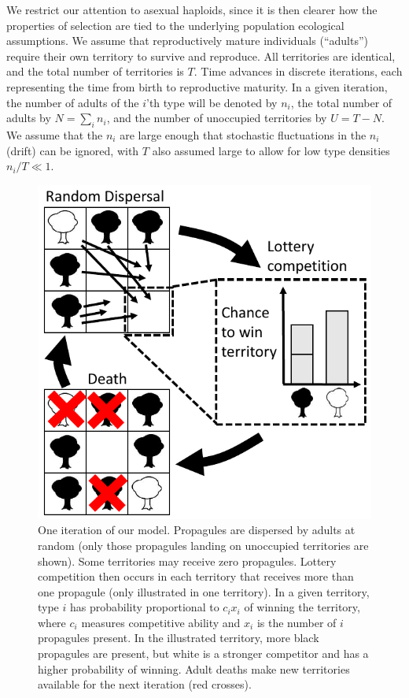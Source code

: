 \documentclass[12pt]{article}
\begin{document}
We restrict our attention to asexual haploids, since it is then clearer how the properties of selection are tied to the underlying population ecological assumptions. We assume that reproductively mature individuals (``adults'') require their own territory to survive and reproduce. All territories are identical, and the total number of territories is $T$. Time advances in discrete iterations, each representing the time from birth to reproductive maturity. In a given iteration, the number of adults of the $i$'th type will be denoted by $n_i$, the total number of adults by $N=\sum_i n_i$, and the number of unoccupied territories by $U=T-N$. We assume that the $n_i$ are large enough that stochastic fluctuations in the $n_i$ (drift) can be ignored, with $T$ also assumed large to allow for low type densities $n_i/T\ll 1$.  

\begin{figure}
\centering
\includegraphics[scale=0.8]{lottery.pdf}
\caption{\label{fig:lottery} One iteration of our model. Propagules are dispersed by adults at random (only those propagules landing on unoccupied territories are shown). Some territories may receive zero propagules. Lottery competition then occurs in each territory that receives more than one propagule (only illustrated in one territory). In a given territory, type $i$ has probability proportional to $c_i x_i$ of winning the territory, where $c_i$ measures competitive ability and $x_i$ is the number of $i$ propagules present. In the illustrated territory, more black propagules are present, but white is a stronger competitor and has a higher probability of winning. Adult deaths make new territories available for the next iteration (red crosses).}
\end{figure}
\end{document}
